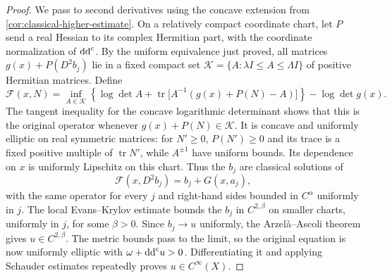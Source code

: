 \begin{proof}
We pass to second derivatives using the concave extension from \cref{cor:classical-higher-estimate}.
On a relatively compact coordinate chart, let $P$ send a real Hessian to its complex Hermitian part, with the coordinate normalization of $\mathrm{dd}^{\mathrm{c}}$.
By the uniform equivalence just proved, all matrices $g(x)+P(D^2b_j)$ lie in a fixed compact set $\mathcal K=\{A:\lambda I\leq A\leq\Lambda I\}$ of positive Hermitian matrices. Define
\[
 \mathcal F(x,N)=\inf_{A\in\mathcal K}
 \left\{\log\det A+\operatorname{tr}\bigl[A^{-1}(g(x)+P(N)-A)\bigr]\right\}
       -\log\det g(x).
\]
The tangent inequality for the concave logarithmic determinant shows that this is the original operator whenever $g(x)+P(N)\in\mathcal K$.
It is concave and uniformly elliptic on real symmetric matrices: for $N'\geq0$, $P(N')\geq0$ and its trace is a fixed positive multiple of $\operatorname{tr}N'$, while $A^{\pm1}$ have uniform bounds. Its dependence on $x$ is uniformly Lipschitz on this chart.
Thus the $b_j$ are classical solutions of
\[
 \mathcal F(x,D^2b_j)=b_j+G(x,a_j),
\]
with the same operator for every $j$ and right-hand sides bounded in $C^\alpha$ uniformly in $j$. The local Evans--Krylov estimate bounds the $b_j$ in $C^{2,\beta}$ on smaller charts, uniformly in $j$, for some $\beta>0$. Since $b_j\to u$ uniformly, the Arzel\`a--Ascoli theorem gives $u\in C^{2,\beta}$.
The metric bounds pass to the limit, so the original equation is now uniformly elliptic with $\omega+\mathrm{dd}^{\mathrm{c}} u>0$.
Differentiating it and applying Schauder estimates repeatedly proves $u\in C^\infty(X)$.
\end{proof}
